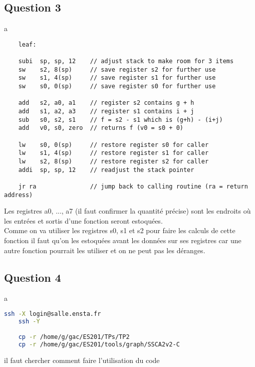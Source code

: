 \documentclass{article}
\begin{document}
\newpage\subsection*{Question 3}
\begin{resolution}
    a
    \begin{scriptsize}
        \myRISCV
        \begin{lstlisting}
    leaf:
    
    subi  sp, sp, 12    // adjust stack to make room for 3 items
    sw    s2, 8(sp)     // save register s2 for further use
    sw    s1, 4(sp)     // save register s1 for further use
    sw    s0, 0(sp)     // save register s0 for further use
    
    add   s2, a0, a1    // register s2 contains g + h
    add   s1, a2, a3    // register s1 contains i + j
    sub   s0, s2, s1    // f = s2 - s1 which is (g+h) - (i+j)
    add   v0, s0, zero  // returns f (v0 = s0 + 0)
    
    lw    s0, 0(sp)     // restore register s0 for caller
    lw    s1, 4(sp)     // restore register s1 for caller
    lw    s2, 8(sp)     // restore register s2 for caller
    addi  sp, sp, 12    // readjust the stack pointer

    jr ra               // jump back to calling routine (ra = return address)
        \end{lstlisting}
    \end{scriptsize}
    Les registres a0, ..., a7 (il faut confirmer la quantité précise) sont les endroits où les entrées et sortis d'une fonction seront estoquées.\\

    Comme on va utiliser les registres s0, s1 et s2 pour faire les calculs de cette fonction il faut qu'on les estoquées avant les données sur ses registres car une autre fonction pourrait les utiliser et on ne peut pas les déranges.
\end{resolution}

\newpage\subsection*{Question 4}
\begin{resolution}
    a
    \begin{scriptsize}
        \mycode
        \begin{lstlisting}[language=bash]
    ssh -X login@salle.ensta.fr
    ssh -Y

    cp -r /home/g/gac/ES201/TPs/TP2
    cp -r /home/g/gac/ES201/tools/graph/SSCA2v2-C
        \end{lstlisting}
    \end{scriptsize}
    il faut chercher comment faire l'utilisation du code 
\end{resolution}
\end{document}
